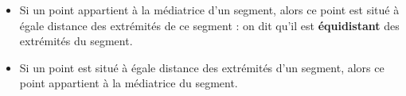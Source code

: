 \begin{propriete}
   \begin{itemize}
      \item Si un point appartient à la médiatrice d'un segment, alors ce point est situé à égale distance des extrémités de ce segment : on dit qu'il est \textbf{équidistant} des
extrémités du segment.
      \item Si un point est situé à égale distance des extrémités d'un segment, alors ce point appartient à la médiatrice du segment. \\ [-8mm]
   \end{itemize}
\end{propriete}



\exercicesbase

